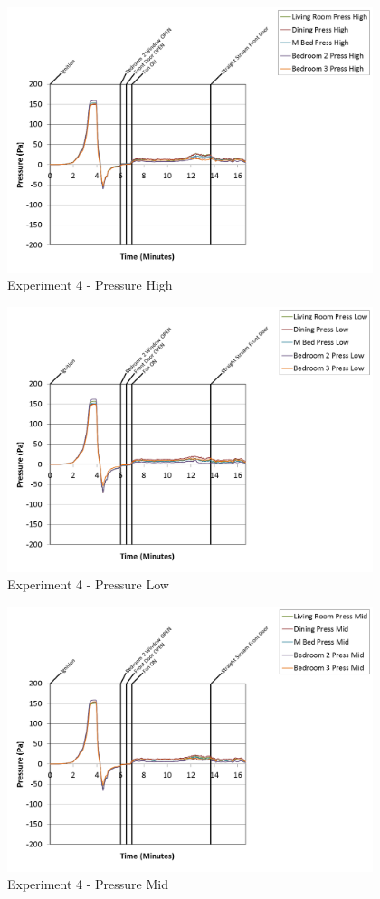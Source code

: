 \documentclass{article}
\begin{document}
\begin{appendices}
\clearpage

\begin{figure}[h!]
	\centering
	\includegraphics[height=3.05in]{0_Images/Results_Charts/Exp_4_Charts/PressureHigh.png}
	\caption{Experiment 4 - Pressure High}
\end{figure}


\begin{figure}[h!]
	\centering
	\includegraphics[height=3.05in]{0_Images/Results_Charts/Exp_4_Charts/PressureLow.png}
	\caption{Experiment 4 - Pressure Low}
\end{figure}

\clearpage

\begin{figure}[h!]
	\centering
	\includegraphics[height=3.05in]{0_Images/Results_Charts/Exp_4_Charts/PressureMid.png}
	\caption{Experiment 4 - Pressure Mid}
\end{figure}



\end{appendices}
\end{document}

